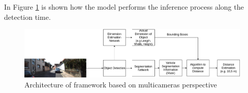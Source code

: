 In Figure \ref{fig:networkBehavior} is shown how the model performs the inference process along the detection time.  

\begin{figure}[H]
\centering
\includegraphics[width=\textwidth]{imagens/Network Behavior.png}
\caption{Architecture of framework based on multicameras perspective}
\label{fig:networkBehavior}
\end{figure}